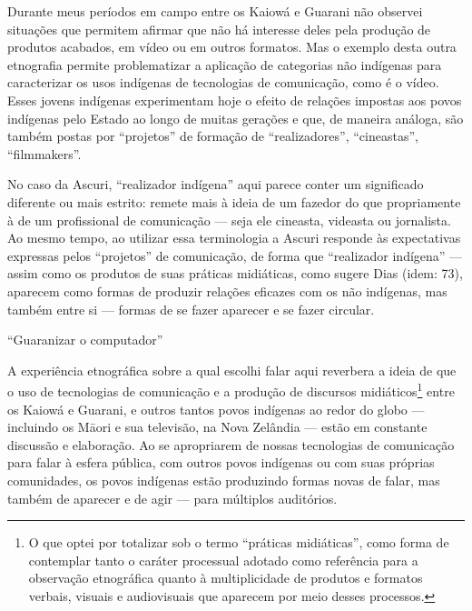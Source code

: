 \documentclass{article}
\begin{document}
Durante meus per\'iodos em campo entre os Kaiow\'a e Guarani n\~ao
observei situa\c{c}\~oes que permitem afirmar que n\~ao h\'a interesse
deles pela produ\c{c}\~ao de produtos acabados, em v\'ideo ou em outros
formatos. Mas o exemplo desta outra etnografia permite problematizar a
aplica\c{c}\~ao de categorias n\~ao ind\'igenas para caracterizar os
usos ind\'igenas de tecnologias de comunica\c{c}\~ao, como \'e o
v\'ideo. Esses jovens ind\'igenas experimentam hoje o efeito de
rela\c{c}\~oes impostas aos povos ind\'igenas pelo Estado ao longo de
muitas gera\c{c}\~oes e que, de maneira an\'aloga, s\~ao tamb\'em
postas por {\textquotedblleft}projetos{\textquotedblright} de
forma\c{c}\~ao de {\textquotedblleft}realizadores{\textquotedblright},
{\textquotedblleft}cineastas{\textquotedblright},
{\textquotedblleft}filmmakers{\textquotedblright}.

No caso da Ascuri, {\textquotedblleft}realizador
ind\'igena{\textquotedblright} aqui parece conter um significado
diferente ou mais estrito: remete mais \`a ideia de um fazedor do que
propriamente \`a de um profissional de comunica\c{c}\~ao --- seja ele
cineasta, videasta ou jornalista. Ao mesmo tempo, ao utilizar essa
terminologia a Ascuri responde \`as expectativas expressas pelos
{\textquotedblleft}projetos{\textquotedblright} de comunica\c{c}\~ao,
de forma que {\textquotedblleft}realizador
ind\'igena{\textquotedblright} --- assim como os produtos de suas
pr\'aticas midi\'aticas, como sugere Dias (idem: 73), aparecem como
formas de produzir rela\c{c}\~oes eficazes com os n\~ao ind\'igenas,
mas tamb\'em entre si --- formas de se fazer aparecer e se fazer
circular.

 {\textquotedblleft}Guaranizar o computador{\textquotedblright}

A experi\^encia etnogr\'afica sobre a qual escolhi falar aqui reverbera
a ideia de que o uso de tecnologias de comunica\c{c}\~ao e a
produ\c{c}\~ao de discursos midi\'aticos\footnote{ O que optei por
totalizar sob o termo {\textquotedblleft}pr\'aticas
midi\'aticas{\textquotedblright}, como forma de contemplar tanto o
car\'ater processual adotado como refer\^encia para a observa\c{c}\~ao
etnogr\'afica quanto \`a multiplicidade de produtos e formatos verbais,
visuais e audiovisuais que aparecem por meio desses processos.} entre
os Kaiow\'a e Guarani, e outros tantos povos ind\'igenas ao redor do
globo --- incluindo os M\=aori e sua televis\~ao, na Nova Zel\^andia
--- est\~ao em constante discuss\~ao e elabora\c{c}\~ao. Ao se
apropriarem de nossas tecnologias de comunica\c{c}\~ao para falar \`a
esfera p\'ublica, com outros povos ind\'igenas ou com suas pr\'oprias
comunidades, os povos ind\'igenas est\~ao produzindo formas novas de
falar, mas tamb\'em de aparecer e de agir --- para m\'ultiplos
audit\'orios.
\end{document}
